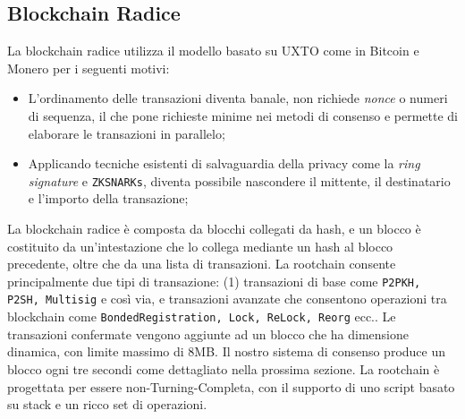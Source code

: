 \subsection{Blockchain Radice}
La blockchain radice utilizza il modello basato su UXTO come in Bitcoin \cite{c21} e Monero \cite{c20} per i seguenti motivi:

\begin{itemize}
	\item
	      L'ordinamento delle transazioni diventa banale, non richiede \emph{nonce} o numeri di sequenza, il che pone richieste minime nei metodi di consenso e permette di elaborare le transazioni in parallelo;
	\item
	      Applicando tecniche esistenti di salvaguardia della privacy come la \emph{ring signature} e \texttt{ZKSNARKs}, diventa possibile nascondere il mittente, il destinatario e l'importo della transazione;
\end{itemize}

La blockchain radice è composta da blocchi collegati da hash, e un blocco è costituito da  un'intestazione che lo collega mediante un hash al blocco precedente, oltre che da una lista di transazioni. La rootchain consente principalmente due tipi di transazione: (1) transazioni di base come \texttt{P2PKH, P2SH, Multisig} e così via, e transazioni avanzate che consentono operazioni tra blockchain come \texttt{BondedRegistration, Lock, ReLock, Reorg} ecc.. Le transazioni confermate vengono aggiunte ad un blocco che ha dimensione dinamica, con limite massimo di 8MB. Il nostro sistema di consenso produce un blocco ogni tre secondi come dettagliato nella prossima sezione. La rootchain è progettata per essere non-Turning-Completa, con il supporto di uno script basato su stack e un ricco set di operazioni.


